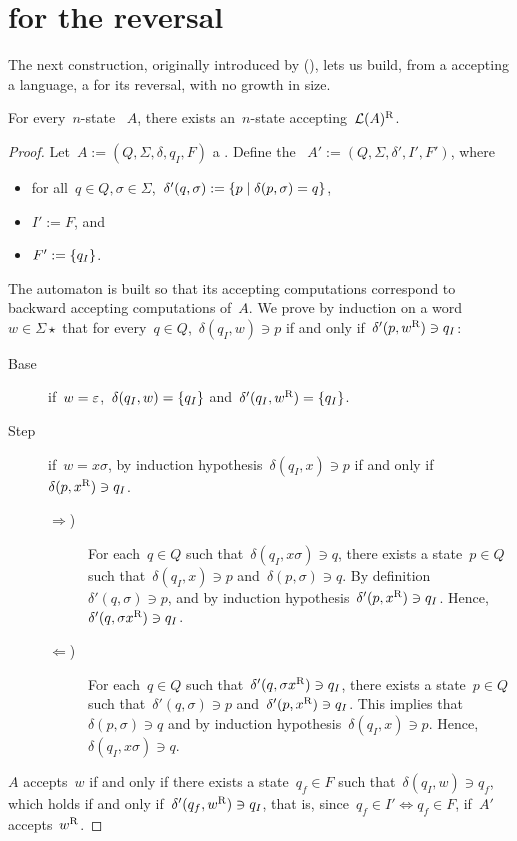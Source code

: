 \section{\texorpdfstring{\ONFA}{1NFA} for the reversal}\label{sub:reversal}
The next construction, originally introduced by \citeauthor{RabSco59} (\cite{RabSco59}), lets us build, from a \ONFA accepting a language, a \ONFA for its reversal, with no growth in size.
\begin{thrm}
	For every~$n$-state \ONFA~$A$, there exists an~$n$-state \ONFA accepting~$\mathcal L(A)^{\mathrm R}$.
\end{thrm}
\begin{proof}
	Let~$A:=(Q,\Sigma,\delta,q_I,F)$ a \ONFA.
	Define the \ONFA~$A':=(Q,\Sigma,\delta',I',F')$, where
	\begin{itemize}
		\item for all~$q\in Q,\sigma\in\Sigma$,~$\delta'(q,\sigma):=\{p \mid \delta(p,\sigma)=q\}$,
		\item $I':=F$, and
		\item $F':=\{q_I\}$.
	\end{itemize}
	The automaton is built so that its accepting computations correspond to backward accepting computations of~$A$.
	We prove by induction on a word~$w\in\Sigma\star$ that for every~$q\in Q$,~$\delta(q_I,w)\ni p$ if and only if~$\delta'(p,w^{\mathrm R})\ni q_I$:
	\begin{description}
		\item[Base] if~$w=\varepsilon$,~$\delta(q_I,w)=\{q_I\}$ and~$\delta'(q_I,w^{\mathrm R})=\{q_I\}$.
		\item[Step] if~$w=x\sigma$, by induction hypothesis~$\delta(q_I,x)\ni p$ if and only if~$\delta(p,x^{\mathrm R})\ni q_I$.
		      \begin{description}
			      \item[$\Rightarrow$)] For each~$q\in Q$ such that~$\delta(q_I,x\sigma)\ni q$, there exists a state~$p\in Q$ such that~$\delta(q_I,x)\ni p$ and~$\delta(p,\sigma)\ni q$.
			            By definition~$\delta'(q,\sigma)\ni p$, and by induction hypothesis~$\delta'(p,x^{\mathrm R})\ni q_I$. Hence,~$\delta'(q,\sigma x^{\mathrm R})\ni q_I$.
			      \item[$\Leftarrow$)] For each~$q\in Q$ such that~$\delta'(q,\sigma x^{\mathrm R})\ni q_I$, there exists a state~$p\in Q$ such that~$\delta'(q,\sigma)\ni p$ and~$\delta'(p,x^{\mathrm R})\ni q_I$.
			            This implies that $\delta(p,\sigma)\ni q$ and by induction hypothesis~$\delta(q_I,x)\ni p$. Hence, $\delta(q_I,x\sigma)\ni q$.
		      \end{description}
	\end{description}
	$A$ accepts~$w$ if and only if there exists a state~$q_f\in F$ such that~$\delta(q_I,w)\ni q_f$, which holds if and only if~$\delta'(q_f,w^{\mathrm R})\ni q_I$, that is, since~$q_f\in I'\iff q_f\in F$, if~$A'$ accepts~$w^{\mathrm R}$.
\end{proof}
